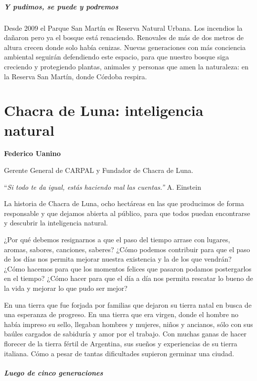 \documentclass[
]{article}
\begin{document}
\hypertarget{y-pudimos-se-puede-y-podremos}{%
\subparagraph{Y pudimos, se puede y
podremos}\label{y-pudimos-se-puede-y-podremos}}

Desde 2009 el Parque San Martín es Reserva Natural Urbana. Los incendios
la dañaron pero ya el bosque está renaciendo. Renovales de más de dos
metros de altura crecen donde solo había cenizas. Nuevas generaciones
con más conciencia ambiental seguirán defendiendo este espacio, para que
nuestro bosque siga creciendo y protegiendo plantas, animales y personas
que amen la naturaleza: en la Reserva San Martín, donde Córdoba respira.

\cleardoublepage

\hypertarget{chacra-de-luna-inteligencia-natural}{%
\section{Chacra de Luna: inteligencia
natural}\label{chacra-de-luna-inteligencia-natural}}

\textbf{Federico Uanino}

Gerente General de CARPAL y Fundador de Chacra de Luna.

``\emph{Si todo te da igual, estás haciendo mal las cuentas.''} A.
Einstein

La historia de Chacra de Luna, ocho hectáreas en las que producimos de
forma responsable y que dejamos abierta al público, para que todos
puedan encontrarse y descubrir la inteligencia natural.

¿Por qué debemos resignarnos a que el paso del tiempo arrase con
lugares, aromas, sabores, canciones, saberes? ¿Cómo podemos contribuir
para que el paso de los días nos permita mejorar nuestra existencia y la
de los que vendrán? ¿Cómo hacemos para que los momentos felices que
pasaron podamos postergarlos en el tiempo? ¿Cómo hacer para que el día a
día nos permita rescatar lo bueno de la vida y mejorar lo que pudo ser
mejor?

En una tierra que fue forjada por familias que dejaron su tierra natal
en busca de una esperanza de progreso. En una tierra que era virgen,
donde el hombre no había impreso su sello, llegaban hombres y mujeres,
niños y ancianos, sólo con sus baúles cargados de sabiduría y amor por
el trabajo. Con muchas ganas de hacer florecer de la tierra fértil de
Argentina, sus sueños y experiencias de su tierra italiana. Cómo a pesar
de tantas dificultades supieron germinar una ciudad.

\hypertarget{luego-de-cinco-generaciones}{%
\subparagraph{Luego de cinco
generaciones}\label{luego-de-cinco-generaciones}}
\end{document}
